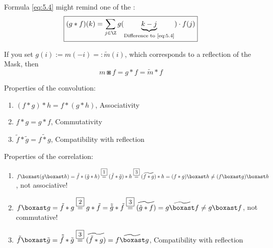         Formula \eqref{eq:5.4} might remind one of the :
        \begin{equation}\label{eq:5.5}
            \framebox{$\displaystyle (g * f)(k) = \sum_{j \in \Z} g(\underbrace{k-j}_{\text{Difference to \eqref{eq:5.4}}}) \cdot f(j)$}
        \end{equation}

        If you set $g(i) := m(-i) =: \tilde m(i)$, which corresponds to a reflection of the Mask, then
        \[m \boxast f = g * f = \tilde m * f\]

        Properties of the convolution:
        \begin{enumerate}
            \item $(f * g) * h = f * (g* h)$, Associativity
            \item $f*g=g*f$, Commutativity
            \item $\tilde f * \tilde g = \widetilde{f * g}$, Compatibility with reflection
        \end{enumerate}
        
        Properties of the correlation:
        \begin{enumerate}
            \item $f \boxast (g \boxast h) = \tilde f * ( \tilde g* h) \overset{\framebox{\small 1}}{=} ( \tilde f * \tilde g) * h \overset{\framebox{\small 3}}{=} (\widetilde{f * g}) * h = (f * g) \boxast h \neq (f \boxast g) \boxast h$, not associative!
            \item $f \boxast g = \tilde f * g \overset{\framebox{\small 2}}{=} g * \tilde f = \tilde{\tilde g} * \tilde f \overset{\framebox{\small 3}}{=} \widetilde{(\tilde g * f)} = \widetilde{g \boxast f} \neq g \boxast f$, not commutative!
            \item $\tilde f \boxast \tilde g = \tilde{\tilde f} * \tilde g \overset{\framebox{\small 3}}{=} \widetilde{(\tilde f * g)} = \widetilde{f \boxast g}$, Compatibility with reflection
        \end{enumerate}
